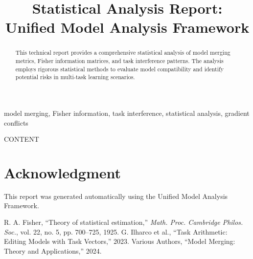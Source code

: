 \documentclass[conference]{IEEEtran}
\begin{document}
\title{Statistical Analysis Report: \\Unified Model Analysis Framework}

\author{
}

\maketitle

\begin{abstract}
This technical report provides a comprehensive statistical analysis of model merging metrics, Fisher information matrices, and task interference patterns. The analysis employs rigorous statistical methods to evaluate model compatibility and identify potential risks in multi-task learning scenarios.
\end{abstract}

\begin{IEEEkeywords}
model merging, Fisher information, task interference, statistical analysis, gradient conflicts
\end{IEEEkeywords}

{{ CONTENT }}

\section*{Acknowledgment}
This report was generated automatically using the Unified Model Analysis Framework.

\begin{thebibliography}{00}
 R. A. Fisher, ``Theory of statistical estimation,'' \textit{Math. Proc. Cambridge Philos. Soc.}, vol. 22, no. 5, pp. 700--725, 1925.
 G. Ilharco et al., ``Task Arithmetic: Editing Models with Task Vectors,'' 2023.
 Various Authors, ``Model Merging: Theory and Applications,'' 2024.
\end{thebibliography}
\end{document}
